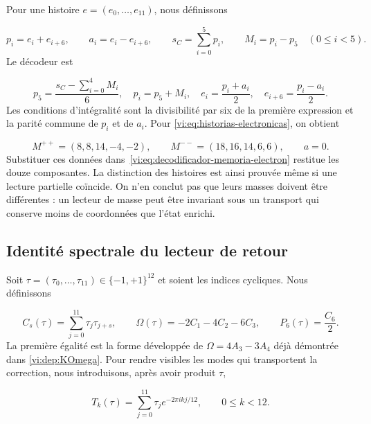 Pour une histoire $e=(e_0,\ldots,e_{11})$, nous définissons

\begin{equation}
 p_i=e_i+e_{i+6},\qquad a_i=e_i-e_{i+6},
 \qquad s_C=\sum_{i=0}^{5}p_i,
 \qquad M_i=p_i-p_5\quad(0\leq i<5).
 \label{vi:eq:codificador-memoria-electron}
\end{equation}
Le décodeur est

\begin{equation}
 p_5=\frac{s_C-\sum_{i=0}^{4}M_i}{6},\quad
 p_i=p_5+M_i,\quad
 e_i=\frac{p_i+a_i}{2},\quad e_{i+6}=\frac{p_i-a_i}{2}.
 \label{vi:eq:decodificador-memoria-electron}
\end{equation}
Les conditions d’intégralité sont la divisibilité par six de la première
expression et la parité commune de $p_i$ et de $a_i$. Pour
\eqref{vi:eq:historias-electronicas}, on obtient

\[
 M^{++}=(8,8,14,-4,-2),\qquad
 M^{--}=(18,16,14,6,6),\qquad a=0.
\]
Substituer ces données dans~\eqref{vi:eq:decodificador-memoria-electron}
restitue les douze composantes. La distinction des histoires est ainsi prouvée
même si une lecture partielle coïncide. On n’en conclut pas que leurs masses doivent être
différentes : un lecteur de masse peut être invariant sous un transport qui
conserve moins de coordonnées que l’état enrichi.


\subsection{Identité spectrale du lecteur de retour
}

Soit $\tau=(\tau_0,\ldots,\tau_{11})\in\{-1,+1\}^{12}$ et soient les indices
cycliques. Nous définissons

\begin{equation}
 C_s(\tau)=\sum_{j=0}^{11}\tau_j\tau_{j+s},
 \qquad
 \Omega(\tau)=-2C_1-4C_2-6C_3,
 \qquad
 P_6(\tau)=\frac{C_6}{2}.
 \label{vi:eq:lectores-correlacion}
\end{equation}
La première égalité est la forme développée de
$\Omega=4A_3-3A_4$ déjà démontrée dans
\eqref{vi:dep:KOmega}. Pour rendre visibles les modes qui transportent la
correction, nous introduisons, après avoir produit $\tau$,

\begin{equation}
 T_k(\tau)=\sum_{j=0}^{11}\tau_j
 e^{-2\pi i k j/12},\qquad 0\leq k<12.
 \label{vi:eq:dft-retorno}
\end{equation}


